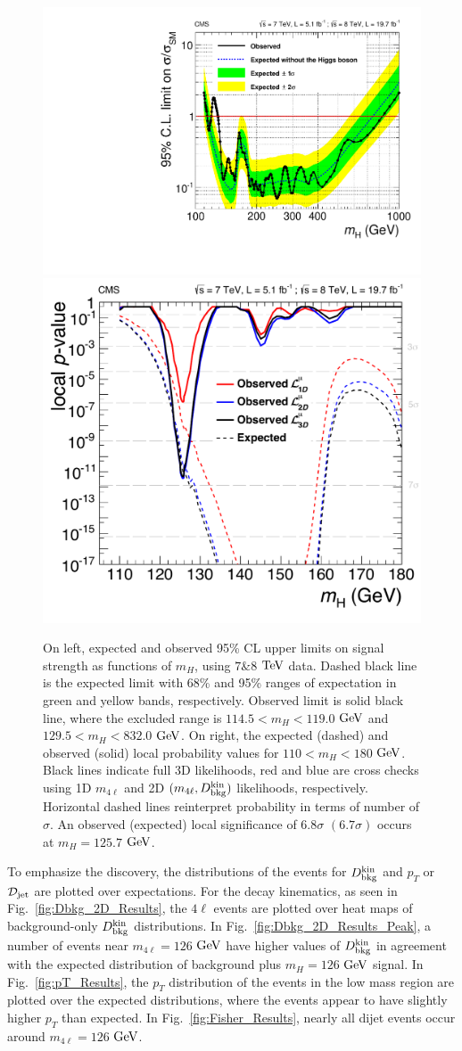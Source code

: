\begin{figure}[htbp]
\begin{center}
\includegraphics[width=.45\linewidth]{HiggsDiscovery/figures/UpperLimit_ASCLS_7p8TeV_wholeMass_Final2_2l2tau.pdf}
\includegraphics[width=.45\linewidth]{HiggsDiscovery/figures/Pvals_PLP_lowMass_1D2D3D_Final3_no2l2tau_7p8sep.pdf}
\caption[Exclusion Limits and Local Probabilities for $4\ell$ Events]{On left, expected and observed 95\% CL upper limits on signal strength as functions of $m_{H}$, using $7\&8$ $\rm{TeV}$ data. Dashed black line is the expected limit with 68\% and 95\% ranges of expectation in green and yellow bands, respectively. Observed limit is solid black line, where the excluded range is $114.5<m_H<119.0$ $\rm{GeV}$ and $129.5<m_H<832.0$ $\rm{GeV}$. On right, the expected (dashed) and observed (solid) local probability values for $110<m_{H}<180$ $\rm{GeV}$. Black lines indicate full 3D likelihoods, red and blue are cross checks using 1D $m_{4\ell}$ and 2D $(m_{4\ell},D_{\rm{bkg}}^{\rm{kin}})$ likelihoods, respectively. Horizontal dashed lines reinterpret probability in terms of number of $\sigma$. An observed (expected) local significance of $6.8\sigma$ $(6.7\sigma)$ occurs at $m_H=125.7$ $\rm{GeV}$.}
\label{fig:ExclusionLimits}
\end{center}
\end{figure}

To emphasize the discovery, the distributions of the events for $D_{\rm{bkg}}^{\rm{kin}}$ and $p_T$ or $\mathcal{D}_{\rm jet}$ are plotted over expectations. For the decay kinematics, as seen in Fig.~\ref{fig:Dbkg_2D_Results}, the $4\ell$ events are plotted over heat maps of background-only $D_{\rm{bkg}}^{\rm{kin}}$ distributions. In Fig.~\ref{fig:Dbkg_2D_Results_Peak}, a number of events near $m_{4\ell}=126$ $\rm{GeV}$ have higher values of $D_{\rm{bkg}}^{\rm{kin}}$ in agreement with the expected distribution of background plus $m_H=126$ $\rm{GeV}$ signal. In Fig.~\ref{fig:pT_Results}, the $p_T$ distribution of the events in the low mass region are plotted over the expected distributions, where the events appear to have slightly higher $p_T$ than expected. In Fig.~\ref{fig:Fisher_Results}, nearly all dijet events occur around $m_{4\ell}=126$ $\rm{GeV}$.

